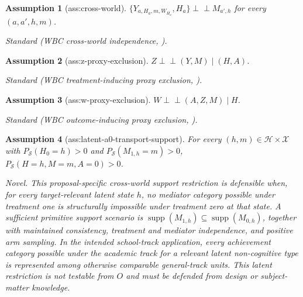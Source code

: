 \documentclass{article}
\newtheorem{assumption}{Assumption}
\begin{document}
\begin{assumption}[ass:cross-world]\label{ass:cross-world}
\(\{Y_{a,H_a,m,W_{H_a}},H_a\}\mathbin{\perp\!\!\!\perp}M_{a',h}\) for every \((a,a',h,m)\).
\par\smallskip\noindent\emph{Standard} (WBC cross-world independence, \cite{WuBaiCui2026}).
\end{assumption}

\begin{assumption}[ass:z-proxy-exclusion]\label{ass:z-proxy-exclusion}
\(Z\mathbin{\perp\!\!\!\perp}(Y,M)\mid(H,A)\).
\par\smallskip\noindent\emph{Standard} (WBC treatment-inducing proxy exclusion, \cite{WuBaiCui2026}).
\end{assumption}

\begin{assumption}[ass:w-proxy-exclusion]\label{ass:w-proxy-exclusion}
\(W\mathbin{\perp\!\!\!\perp}(A,Z,M)\mid H\).
\par\smallskip\noindent\emph{Standard} (WBC outcome-inducing proxy exclusion, \cite{WuBaiCui2026}).
\end{assumption}

\begin{assumption}[ass:latent-a0-transport-support]\label{ass:latent-a0-transport-support}
For every \((h,m)\in\mathcal H\times\mathcal X\) with \(P_{\mathcal S}(H_0=h)>0\) and \(P_{\mathcal S}(M_{1,h}=m)>0\), \(P_{\mathcal S}(H=h,M=m,A=0)>0\).
\par\smallskip\noindent\emph{Novel.} This proposal-specific cross-world support restriction is defensible when, for every target-relevant latent state \(h\), no mediator category possible under treatment one is structurally impossible under treatment zero at that state. A sufficient primitive support scenario is \(\operatorname{supp}(M_{1,h})\subseteq\operatorname{supp}(M_{0,h})\), together with maintained consistency, treatment and mediator independence, and positive arm sampling. In the intended school-track application, every achievement category possible under the academic track for a relevant latent non-cognitive type is represented among otherwise comparable general-track units. This latent restriction is not testable from \(O\) and must be defended from design or subject-matter knowledge.
\end{assumption}
\end{document}
